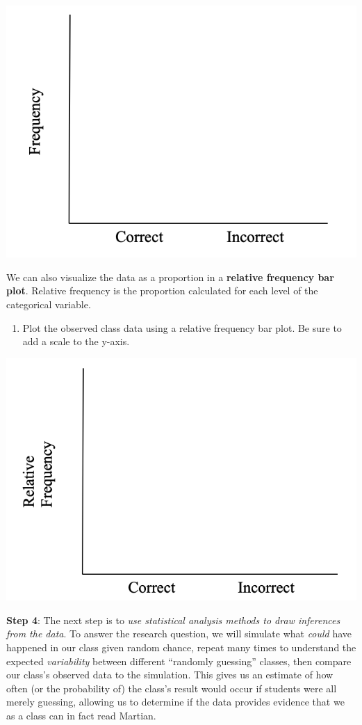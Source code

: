 \documentclass[
]{report}
\providecommand{\tightlist}{%
  \setlength{\itemsep}{0pt}\setlength{\parskip}{0pt}}
\begin{document}
\begin{center}\includegraphics[width=0.4\linewidth]{images/barplot_martian} \end{center}

We can also visualize the data as a proportion in a \textbf{relative frequency bar plot}. Relative frequency is the proportion calculated for each level of the categorical variable.

\begin{enumerate}
\def\labelenumi{\arabic{enumi}.}
\setcounter{enumi}{7}
\tightlist
\item
  Plot the observed class data using a relative frequency bar plot. Be sure to add a scale to the y-axis.
\end{enumerate}

\begin{center}\includegraphics[width=0.4\linewidth]{images/relative_barplot_martian} \end{center}

\textbf{Step 4}: The next step is to \emph{use statistical analysis methods to draw inferences from the data}. To answer the research question, we will simulate what \emph{could} have happened in our class given random chance, repeat many times to understand the expected \emph{variability} between different ``randomly guessing'' classes, then compare our class's observed data to the simulation. This gives us an estimate of how often (or the probability of) the class's result would occur if students were all merely guessing, allowing us to determine if the data provides evidence that we as a class can in fact read Martian.
\end{document}
